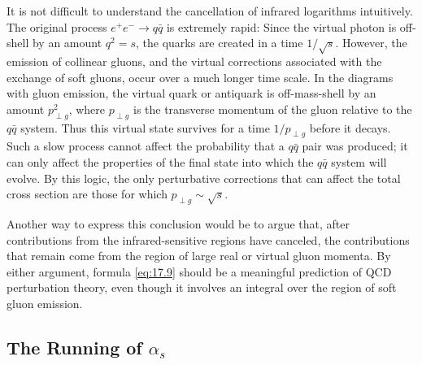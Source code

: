 It is not difficult to understand the cancellation of infrared logarithms
intuitively.  The original process $e^{+}e^{-}\to q\bar{q}$ is extremely
rapid: Since the virtual photon is off-shell by an amount $q^2 = s$, the
quarks are created in a time $1/\sqrt{s}$.  However, the emission of collinear
gluons, and the virtual corrections associated with the exchange of soft
gluons, occur over a much longer time scale.  In the diagrams with gluon
emission, the virtual quark or antiquark is off-mass-shell by an amount
$p^2_{\perp g}$, where $p_{\perp g}$ is the transverse momentum of the gluon
relative to the $q\bar{q}$ system.  Thus this virtual state survives for a
time $1/p_{\perp g}$ before it decays.  Such a slow process cannot affect the
probability that a $q\bar{q}$ pair was produced; it can only affect the
properties of the final state into which the $q\bar{q}$ system will evolve.
By this logic, the only perturbative corrections that can affect the total
cross section are those for which $p_{\perp g} \sim \sqrt{s}$.

Another way to express this conclusion would be to argue that, after
contributions from the infrared-sensitive regions have canceled, the
contributions that remain come from the region of large real or virtual gluon
momenta.  By either argument, formula \eqref{eq:17.9} should be a meaningful
prediction of QCD perturbation theory, even though it involves an integral
over the region of soft gluon emission.

\subsection{The Running of $\alpha_s$}


